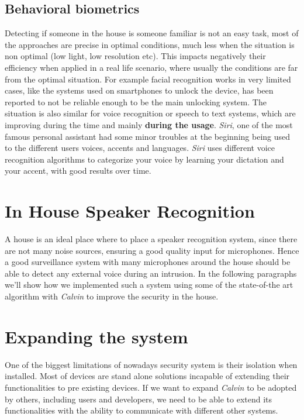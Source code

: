 \subsection{Behavioral biometrics}
Detecting if someone in the house is someone familiar is not an easy task, most
of the approaches are precise in optimal conditions, much less when the situation
is non optimal (low light, low resolution etc). This impacts negatively their efficiency
when applied in a real life scenario, where usually the conditions are far from the optimal
situation. For example facial recognition works in very limited cases, like the systems
used on smartphones to unlock the device, has been reported to not be reliable enough
to be the main unlocking system. The situation is also similar for voice recognition or
speech to text systems, which are improving during the time and mainly \textbf{during the usage}.
\textit{Siri}, one of the most famous personal assistant had some minor troubles at the beginning
being used to the different users voices, accents and languages. \textit{Siri} uses
different voice recognition algorithms to categorize your voice by learning your
dictation and your accent, with good results over time.


\section{In House Speaker Recognition}

A house is an ideal place where to place a speaker recognition system,
since there are not many noise sources, ensuring a good quality input
for microphones. Hence a good surveillance system with many microphones around
the house should be able to detect any external voice during an intrusion. In the following
paragraphs we'll show how we implemented such a system using some of the state-of-the art
algorithm with \textit{Calvin} to improve the security in the house.


\section{Expanding the system}
One of the biggest limitations of nowadays security system is their isolation
when installed. Most of devices are stand alone solutions incapable of extending
their functionalities to pre existing devices. If we want to expand \textit{Calvin} to
be adopted by others, including users and developers, we need to be able to extend its
functionalities with the ability to communicate with different other systems.

